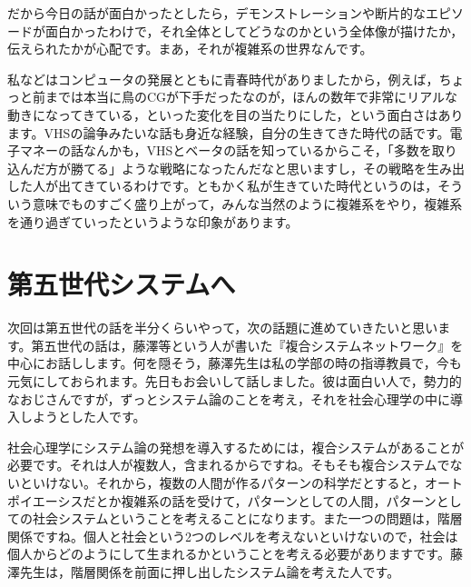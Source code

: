 \documentclass{ltjsbook}
\begin{document}
だから今日の話が面白かったとしたら，デモンストレーションや断片的なエピソードが面白かったわけで，それ全体としてどうなのかという全体像が描けたか，伝えられたかが心配です。まあ，それが複雑系の世界なんです。

私などはコンピュータの発展とともに青春時代がありましたから，例えば，ちょっと前までは本当に鳥のCGが下手だったなのが，ほんの数年で非常にリアルな動きになってきている，といった変化を目の当たりにした，という面白さはあります。VHSの論争みたいな話も身近な経験，自分の生きてきた時代の話です。電子マネーの話なんかも，VHSとベータの話を知っているからこそ，「多数を取り込んだ方が勝てる」ような戦略になったんだなと思いますし，その戦略を生み出した人が出てきているわけです。ともかく私が生きていた時代というのは，そういう意味でものすごく盛り上がって，みんな当然のように複雑系をやり，複雑系を通り過ぎていったというような印象があります。

\section{第五世代システムへ}

次回は第五世代の話を半分くらいやって，次の話題に進めていきたいと思います。第五世代の話は，藤澤等という人が書いた『複合システムネットワーク』\parencite{fujisawaNetwork}を中心にお話しします。何を隠そう，藤澤先生は私の学部の時の指導教員で，今も元気にしておられます。先日もお会いして話しました。彼は面白い人で，勢力的なおじさんですが，ずっとシステム論のことを考え，それを社会心理学の中に導入しようとした人です。

社会心理学にシステム論の発想を導入するためには，複合システムがあることが必要です。それは人が複数人，含まれるからですね。そもそも複合システムでないといけない。それから，複数の人間が作るパターンの科学だとすると，オートポイエーシスだとか複雑系の話を受けて，パターンとしての人間，パターンとしての社会システムということを考えることになります。また一つの問題は，階層関係ですね。個人と社会という2つのレベルを考えないといけないので，社会は個人からどのようにして生まれるかということを考える必要がありますです。藤澤先生は，階層関係を前面に押し出したシステム論を考えた人です。
\end{document}
